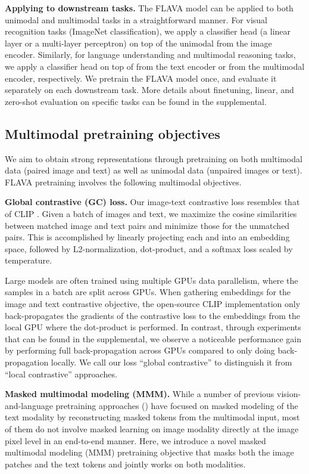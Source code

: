 \documentclass[10pt,twocolumn,letterpaper]{article}
\newcommand{\myparagraph}[1]{\vspace{0.25em}\noindent\textbf{#1}}
\begin{document}
\myparagraph{Applying to downstream tasks.} The FLAVA model can be applied to both unimodal and multimodal tasks in a straightforward manner. For visual recognition tasks (\eg ImageNet classification), we apply a classifier head (\eg a linear layer or a multi-layer perceptron) on top of the unimodal  from the image encoder. Similarly, for language understanding and multimodal reasoning tasks, we apply a classifier head on top of  from the text encoder or  from the multimodal encoder, respectively. We pretrain the FLAVA model once, and evaluate it separately on each downstream task. More details about finetuning, linear, and zero-shot evaluation on specific tasks can be found in the supplemental.

\subsection{Multimodal pretraining objectives}
\label{sec:multimodal}

We aim to obtain strong representations through pretraining on both multimodal data (paired image and text) as well as unimodal data (unpaired images or text). FLAVA pretraining involves the following multimodal objectives.

\myparagraph{Global contrastive (GC) loss.} Our image-text contrastive loss resembles that of CLIP \cite{radford2021learning}. Given a batch of images and text, we maximize the cosine similarities between matched image and text pairs and minimize those for the unmatched pairs. This is accomplished by linearly projecting each  and  into an embedding space, followed by L2-normalization, dot-product, and a softmax loss scaled by temperature.

Large models are often trained using multiple GPUs data parallelism, where the samples in a batch are split across GPUs. When gathering embeddings for the image and text contrastive objective, the open-source CLIP implementation \cite{ilharco_gabriel_2021_5143773} only back-propagates the gradients of the contrastive loss to the embeddings from the local GPU where the dot-product is performed. In contrast, through experiments that can be found in the supplemental, we observe a noticeable performance gain by performing full back-propagation across GPUs compared to only doing back-propagation locally. We call our loss ``global contrastive''  to distinguish it from ``local contrastive'' approaches.

\myparagraph{Masked multimodal modeling (MMM).} While a number of previous vision-and-language pretraining approaches (\eg \cite{li2019visualbert}) have focused on masked modeling of the text modality by reconstructing masked tokens from the multimodal input, most of them do not involve masked learning on image modality directly at the image pixel level in an end-to-end manner. Here, we introduce a novel masked multimodal modeling (MMM) pretraining objective  that masks both the image patches and the text tokens and jointly works on both modalities.
\end{document}

